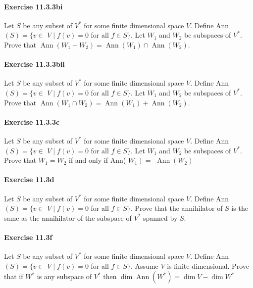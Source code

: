 \documentclass{article}
\begin{document}
\paragraph{Exercise 11.3.3bi} Let $S$ be any subset of $V^*$ for some finite dimensional space $V$. Define Ann $(S)=\{v \in$ $V \mid f(v)=0$ for all $f \in S\} .$ Let $W_1$ and $W_2$ be subspaces of $V^*$. Prove that $\operatorname{Ann}\left(W_1+W_2\right)=\operatorname{Ann}\left(W_1\right) \cap\operatorname{Ann}\left(W_2\right)$. 

\paragraph{Exercise 11.3.3bii} Let $S$ be any subset of $V^*$ for some finite dimensional space $V$. Define Ann $(S)=\{v \in$ $V \mid f(v)=0$ for all $f \in S\} .$ Let $W_1$ and $W_2$ be subspaces of $V^*$. Prove that $\operatorname{Ann}\left(W_1\cap W_2\right)=\operatorname{Ann}\left(W_1\right) + \operatorname{Ann}\left(W_2\right)$. 

\paragraph{Exercise 11.3.3c} Let $S$ be any subset of $V^*$ for some finite dimensional space $V$. Define Ann $(S)=\{v \in$ $V \mid f(v)=0$ for all $f \in S\} .$ Let $W_1$ and $W_2$ be subspaces of $V^*$. Prove that $W_1=W_2$ if and only if Ann( $\left.W_1\right)=$ $\operatorname{Ann}\left(W_2\right)$ 

\paragraph{Exercise 11.3d} Let $S$ be any subset of $V^*$ for some finite dimensional space $V$. Define Ann $(S)=\{v \in$ $V \mid f(v)=0$ for all $f \in S\} .$ Prove that the annihilator of $S$ is the same as the annihilator of the subspace of $V^*$ spanned by $S$.

\paragraph{Exercise 11.3f} Let $S$ be any subset of $V^*$ for some finite dimensional space $V$. Define Ann $(S)=\{v \in$ $V \mid f(v)=0$ for all $f \in S\} .$ Assume $V$ is finite dimensional. Prove that if $W^*$ is any subspace of $V^*$ then $\operatorname{dim} \operatorname{Ann}\left(W^*\right)=\operatorname{dim} V-\operatorname{dim} W^*$
\end{document}
